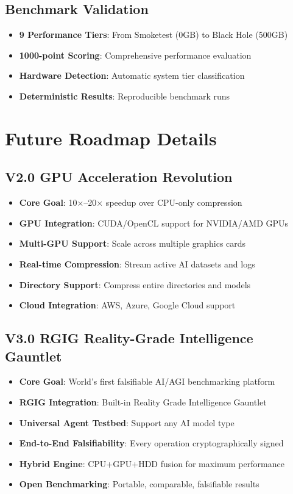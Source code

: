 \documentclass[12pt,a4paper]{article}
\begin{document}
\subsection{Benchmark Validation}
\begin{itemize}
    \item \textbf{9 Performance Tiers}: From Smoketest (0GB) to Black Hole (500GB)
    \item \textbf{1000-point Scoring}: Comprehensive performance evaluation
    \item \textbf{Hardware Detection}: Automatic system tier classification
    \item \textbf{Deterministic Results}: Reproducible benchmark runs
\end{itemize}

\newpage

\section{Future Roadmap Details}

\subsection{V2.0 GPU Acceleration Revolution}
\begin{itemize}
    \item \textbf{Core Goal}: 10×–20× speedup over CPU-only compression
    \item \textbf{GPU Integration}: CUDA/OpenCL support for NVIDIA/AMD GPUs
    \item \textbf{Multi-GPU Support}: Scale across multiple graphics cards
    \item \textbf{Real-time Compression}: Stream active AI datasets and logs
    \item \textbf{Directory Support}: Compress entire directories and models
    \item \textbf{Cloud Integration}: AWS, Azure, Google Cloud support
\end{itemize}

\subsection{V3.0 RGIG Reality-Grade Intelligence Gauntlet}
\begin{itemize}
    \item \textbf{Core Goal}: World's first falsifiable AI/AGI benchmarking platform
    \item \textbf{RGIG Integration}: Built-in Reality Grade Intelligence Gauntlet
    \item \textbf{Universal Agent Testbed}: Support any AI model type
    \item \textbf{End-to-End Falsifiability}: Every operation cryptographically signed
    \item \textbf{Hybrid Engine}: CPU+GPU+HDD fusion for maximum performance
    \item \textbf{Open Benchmarking}: Portable, comparable, falsifiable results
\end{itemize}
\end{document}
